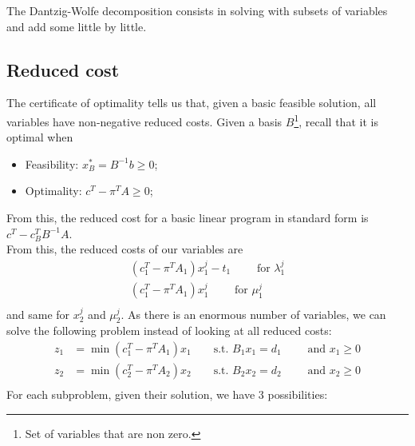 \documentclass[12pt, openany]{report}
\theoremstyle{definition}
\begin{document}
The Dantzig-Wolfe decomposition consists in solving with subsets of variables and add some little by little. 
\subsection{Reduced cost}
The certificate of optimality tells us that, given a basic feasible solution, all variables have non-negative reduced costs. Given a basis $B$\footnote{Set of variables that are non zero.}, recall that it is optimal when 
\begin{itemize}
	\item Feasibility: $x_B^* =B^{-1}b\ge 0$;
	\item Optimality: $c^T - \pi^TA \ge 0$;
\end{itemize} 
From this, the reduced cost for a basic linear program in standard form is $c^T - c^T_BB^{-1}A$.\\
From this, the reduced costs of our variables are
\begin{equation}	
	\begin{aligned}
		(c_1^T-\pi^TA_1)x_1^j - t_1 \qquad \text{ for } \lambda_1^j\\
		(c_1^T-\pi^TA_1)x_1^j \qquad \text{ for } \mu_1^j\\
	\end{aligned}
\end{equation}
and same for $x_2^j$ and $\mu_2^j$. As there is an enormous number of variables, we can solve the following problem instead of looking at all reduced costs:
\begin{equation}
	\begin{aligned}	
		z_1 &= \min(c_1^T-\pi^TA_1)x_1 \qquad \text{s.t. } B_1x_1=d_1\qquad \text{ and }x_1\ge 0\\
		z_2 &= \min(c_2^T-\pi^TA_2)x_2 \qquad \text{s.t. } B_2x_2=d_2\qquad \text{ and }x_2\ge 0\\
	\end{aligned}	
\end{equation}
For each subproblem, given their solution, we have 3 possibilities:
\end{document}
